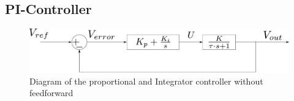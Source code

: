  
  
 





\subsection{PI-Controller}

  \begin{figure}[H]
  	\centering
  	\includegraphics[scale=0.4]{figures/proportionalIntegratorController.pdf}
  	\caption{Diagram of the proportional and Integrator controller without feedforward}
  	\label{proportionalIntegratorController}
  \end{figure}